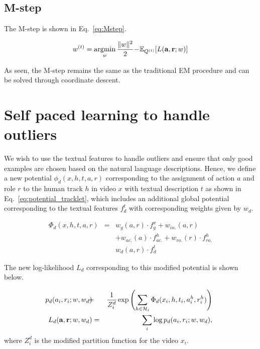 \documentclass[10pt,twocolumn,letterpaper]{article}
\DeclareMathOperator*{\argmin}{\arg\!\min}
\begin{document}
\subsection{M-step}

The M-step is shown in Eq.~\ref{eq:Mstep}.

\begin{equation}\label{eq:Mstep}
 w^{(t)} =  \argmin \limits_{w} \frac{\|w \|^2}{2} \hspace*{-2pt} - \hspace*{-2pt} \mathbb{E}_{Q^{(t)}}[L(\mathbf{a}, \mathbf{r}; w)]
\end{equation}

As seen, the M-step remains the same as the traditional EM procedure and can be solved through coordinate descent.

\section{Self paced learning to handle outliers}
We wish to use the textual features to handle outliers and ensure that only good examples are chosen 
based on the natural language descriptions. Hence, we define a new potential $\phi_d(x,h,t,a,r)$ 
corresponding to the assignment of action $a$ and role $r$ to the human track $h$ in video $x$ with 
textual description $t$ as shown in Eq.~\ref{eq:potential_tracklet}, 
which includes an additional global potential corresponding to 
the textual features $f_d^{t}$ with corresponding weights given by $w_d$.

\begin{eqnarray}\label{eq:potential_tracklet}
  \Phi_d(x, h, t, a, r) & = & w_{g}(a,r) \cdot f_{g}^x + w_{in.}(a,r) \\ \nonumber
                   & & + w_{ac.}(a) \cdot f_{ac.}^h + w_{ro.}(r) \cdot f_{ro.}^h \\ \nonumber
                   & &  w_d(a, r) \cdot f_d^{t} \nonumber
\end{eqnarray}

The new log-likelihood $L_d$ corresponding to this modified potential is shown below.

\begin{eqnarray}\label{eq:prob_assignment}\nonumber
 \hspace*{-10pt} p_d(a_i, r_i; w, w_d) & \hspace*{-8pt}  = \hspace*{-8pt}  & \frac{1}{Z_i^d} \exp \left(\sum \limits_{h \in \mathcal{H}_i} \Phi_d(x_i, h,t_i,a_i^h, r_i^h) \right) \\ \nonumber
  L_d(\mathbf{a}, \mathbf{r}; w, w_d) & = & \sum \limits_{i} \log p_d(a_i, r_i; w, w_d),
\end{eqnarray}where $Z_i^d$ is the modified partition function for the video $x_i$.
\end{document}
